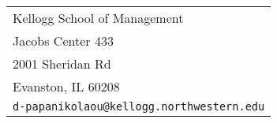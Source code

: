 \documentclass[11pt,letterpaper,serif,overlapped]{res}
\begin{document}

\setlength{\leftmargini}{0em}
\renewcommand{\labelitemi}{}

\renewcommand{\namefont}{\large\textbf}



\begin{resume}

\begin{tabular}{l}
  Kellogg School of Management            \\
  Jacobs Center 433           \\
  2001 Sheridan Rd                         \\
  Evanston, IL 60208               \\
  {\tt d-papanikolaou@kellogg.northwestern.edu}  \\
\end{tabular}
\vspace{1.5cm}




\end{resume}
\end{document}
